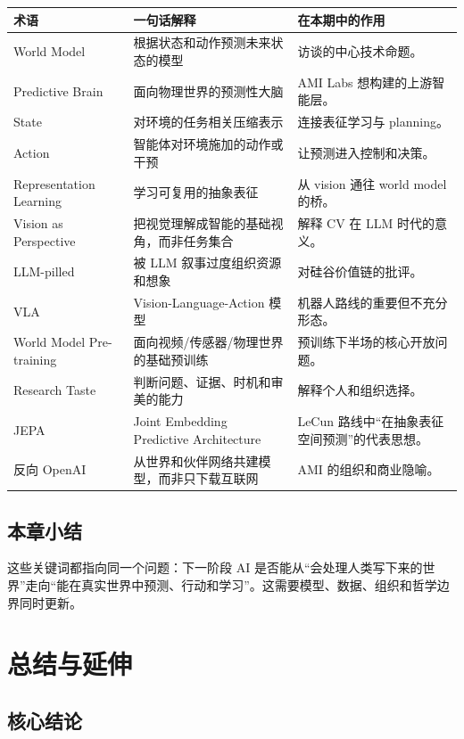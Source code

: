 \documentclass[a4paper]{article}
\begin{document}
\begin{longtable}{p{}p{}p{}}
\toprule
术语 & 一句话解释 & 在本期中的作用 \\
\midrule
World Model & 根据状态和动作预测未来状态的模型 & 访谈的中心技术命题。 \\
Predictive Brain & 面向物理世界的预测性大脑 & AMI Labs 想构建的上游智能层。 \\
State & 对环境的任务相关压缩表示 & 连接表征学习与 planning。 \\
Action & 智能体对环境施加的动作或干预 & 让预测进入控制和决策。 \\
Representation Learning & 学习可复用的抽象表征 & 从 vision 通往 world model 的桥。 \\
Vision as Perspective & 把视觉理解成智能的基础视角，而非任务集合 & 解释 CV 在 LLM 时代的意义。 \\
LLM-pilled & 被 LLM 叙事过度组织资源和想象 & 对硅谷价值链的批评。 \\
VLA & Vision-Language-Action 模型 & 机器人路线的重要但不充分形态。 \\
World Model Pre-training & 面向视频/传感器/物理世界的基础预训练 & 预训练下半场的核心开放问题。 \\
Research Taste & 判断问题、证据、时机和审美的能力 & 解释个人和组织选择。 \\
JEPA & Joint Embedding Predictive Architecture & LeCun 路线中“在抽象表征空间预测”的代表思想。 \\
反向 OpenAI & 从世界和伙伴网络共建模型，而非只下载互联网 & AMI 的组织和商业隐喻。 \\
\bottomrule
\end{longtable}

\subsection{本章小结}

这些关键词都指向同一个问题：下一阶段 AI 是否能从“会处理人类写下来的世界”走向“能在真实世界中预测、行动和学习”。这需要模型、数据、组织和哲学边界同时更新。

\section{总结与延伸}

\subsection{核心结论}
\end{document}
